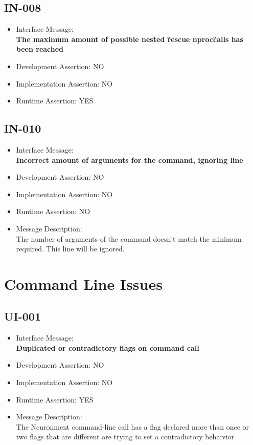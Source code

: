 \subsection{IN-008}
\begin{itemize}
  \item Interface Message:\\[1em]
    \textbf{The maximum amount of possible nested \"rescue nproc\" calls has been reached}
  \item Development Assertion: NO
  \item Implementation Assertion: NO
  \item Runtime Assertion: YES
\end{itemize}

\subsection{IN-010}
\begin{itemize}
  \item Interface Message:\\[1em]
    \textbf{Incorrect amount of arguments for the command, ignoring line}
  \item Development Assertion: NO
  \item Implementation Assertion: NO
  \item Runtime Assertion: NO
  \item Message Description:\\[1em]
    The number of arguments of the command doesn't match the minimum required. This line will be ignored.
\end{itemize}

\section{Command Line Issues}

\subsection{UI-001}
\begin{itemize}
  \item Interface Message:\\[1em]
    \textbf{Duplicated or contradictory flags on command call}
  \item Development Assertion: NO
  \item Implementation Assertion: NO
  \item Runtime Assertion: YES
  \item Message Description:\\[1em]
    The Neuronment command-line call has a flag declared more than once or two flags that are different are trying to set a contradictory behaivior
\end{itemize}

